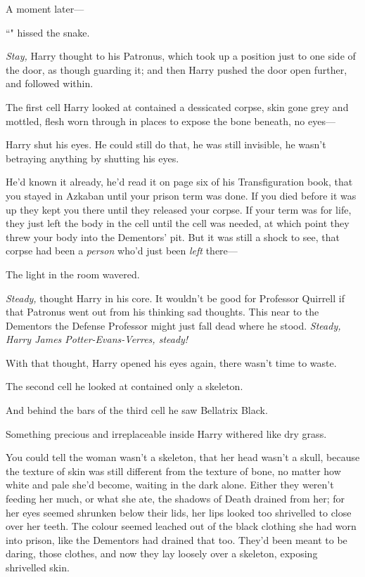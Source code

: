 A moment later—

``" hissed the snake.

\emph{Stay,} Harry thought to his Patronus, which took up a position just to one side of the door, as though guarding it; and then Harry pushed the door open further, and followed within.

The first cell Harry looked at contained a dessicated corpse, skin gone grey and mottled, flesh worn through in places to expose the bone beneath, no eyes—

Harry shut his eyes. He could still do that, he was still invisible, he wasn't betraying anything by shutting his eyes.

He'd known it already, he'd read it on page six of his Transfiguration book, that you stayed in Azkaban until your prison term was done. If you died before it was up they kept you there until they released your corpse. If your term was for life, they just left the body in the cell until the cell was needed, at which point they threw your body into the Dementors' pit. But it was still a shock to see, that corpse had been a \emph{person} who'd just been \emph{left} there—

The light in the room wavered.

\emph{Steady,} thought Harry in his core. It wouldn't be good for Professor Quirrell if that Patronus went out from his thinking sad thoughts. This near to the Dementors the Defense Professor might just fall dead where he stood. \emph{Steady, Harry James Potter-Evans-Verres, steady!}

With that thought, Harry opened his eyes again, there wasn't time to waste.

The second cell he looked at contained only a skeleton.

And behind the bars of the third cell he saw Bellatrix Black.

Something precious and irreplaceable inside Harry withered like dry grass.

You could tell the woman wasn't a skeleton, that her head wasn't a skull, because the texture of skin was still different from the texture of bone, no matter how white and pale she'd become, waiting in the dark alone. Either they weren't feeding her much, or what she ate, the shadows of Death drained from her; for her eyes seemed shrunken below their lids, her lips looked too shrivelled to close over her teeth. The colour seemed leached out of the black clothing she had worn into prison, like the Dementors had drained that too. They'd been meant to be daring, those clothes, and now they lay loosely over a skeleton, exposing shrivelled skin.

